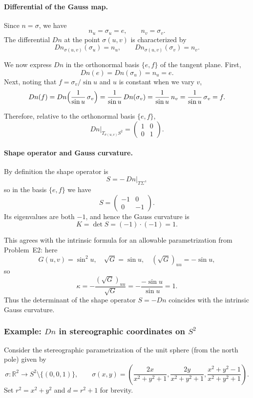 \documentclass[12pt,a4paper]{article}
\theoremstyle{plain}
\theoremstyle{definition}      %
\begin{document}
\paragraph{Differential of the Gauss map.}
Since $n=\sigma$, we have
\[
n_{u} = \sigma_{u} = e,\qquad
n_{v} = \sigma_{v}.
\]
The differential $Dn$ at the point $\sigma(u,v)$ is characterized by
\[
Dn_{\sigma(u,v)}(\sigma_{u}) = n_{u},\qquad
Dn_{\sigma(u,v)}(\sigma_{v}) = n_{v}.
\]

We now express $Dn$ in the orthonormal basis $\{e,f\}$ of the tangent plane.
First,
\[
Dn(e) = Dn(\sigma_{u}) = n_{u} = e.
\]
Next, noting that $f = \sigma_{v}/\sin u$ and $u$ is constant when we vary
$v$,
\[
Dn(f)
= Dn\Bigl(\frac{1}{\sin u}\,\sigma_{v}\Bigr)
= \frac{1}{\sin u}\,Dn(\sigma_{v})
= \frac{1}{\sin u}\,n_{v}
= \frac{1}{\sin u}\,\sigma_{v}
= f.
\]

Therefore, relative to the orthonormal basis $\{e,f\}$,
\[
Dn|_{T_{\sigma(u,v)}S^{2}} =
\begin{pmatrix}
	1 & 0\\
	0 & 1
\end{pmatrix}.
\]

\paragraph{Shape operator and Gauss curvature.}
By definition the shape operator is
\[
S = -\,Dn|_{T\Sigma},
\]
so in the basis $\{e,f\}$ we have
\[
S =
\begin{pmatrix}
	-1 & 0\\
	0 & -1
\end{pmatrix}.
\]
Its eigenvalues are both $-1$, and hence the Gauss curvature is
\[
K = \det S = (-1)\cdot(-1) = 1.
\]

This agrees with the intrinsic formula for an allowable parametrization from
Problem~E2: here
\[
G(u,v)=\sin^{2}u,\quad \sqrt{G}=\sin u,\quad
(\sqrt{G})_{uu} = -\sin u,
\]
so
\[
\kappa = -\frac{(\sqrt{G})_{uu}}{\sqrt{G}}
= -\frac{-\sin u}{\sin u} = 1.
\]
Thus the determinant of the shape operator $S=-Dn$ coincides with the
intrinsic Gauss curvature.

\subsubsection*{Example: $Dn$ in stereographic coordinates on $S^2$}

Consider the stereographic parametrization of the unit sphere
(from the north pole) given by
\[
\sigma : \mathbb{R}^2 \longrightarrow S^2 \setminus \{(0,0,1)\},
\qquad
\sigma(x,y)
=
\left(
\frac{2x}{x^2 + y^2 + 1},
\frac{2y}{x^2 + y^2 + 1},
\frac{x^2 + y^2 - 1}{x^2 + y^2 + 1}
\right).
\]
Set $r^2 = x^2 + y^2$ and $d = r^2 + 1$ for brevity.
\end{document}
